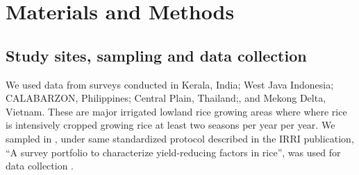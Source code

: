 \section*{Materials and Methods}

\subsection*{Study sites, sampling and data collection}
We used data from surveys conducted in Kerala, India; West Java Indonesia; CALABARZON, Philippines; Central Plain, Thailand;, and Mekong Delta, Vietnam. These are major irrigated lowland rice growing areas where where rice is intensively cropped growing rice at least two seasons per year per year. We sampled in , under same standardized protocol described in the IRRI publication, ``A survey portfolio to characterize yield-reducing factors in rice'', was used for data collection \cite{Savarysurvey2009}.